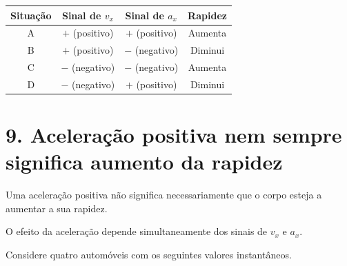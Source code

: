 \documentclass[11pt,a4paper]{article}
\begin{document}
\begin{enumerate}[label=\textbf{\arabic*.},resume]
		\begin{solucao}
			\begin{center}
				\renewcommand{\arraystretch}{1.3}
				\begin{tabular}{c|c|c|c}
					\toprule
					\textbf{Situação} & \textbf{Sinal de $v_x$} & \textbf{Sinal de $a_x$} & \textbf{Rapidez} \\
					\midrule
					A & $+$ (positivo) & $+$ (positivo) & Aumenta \\
					B & $+$ (positivo) & $-$ (negativo) & Diminui \\
					C & $-$ (negativo) & $-$ (negativo) & Aumenta \\
					D & $-$ (negativo) & $+$ (positivo) & Diminui \\
					\bottomrule
				\end{tabular}
			\end{center}
		\end{solucao}
		
	\end{enumerate}
	
	\section*{9. Aceleração positiva nem sempre significa aumento da rapidez}
	
	\begin{atencao}
		
		Uma aceleração positiva não significa necessariamente que o corpo esteja a
		aumentar a sua rapidez.
		
		O efeito da aceleração depende simultaneamente dos sinais de $v_x$ e
		$a_x$.
		
	\end{atencao}
	
	Considere quatro automóveis com os seguintes valores instantâneos.
	
\end{document}
